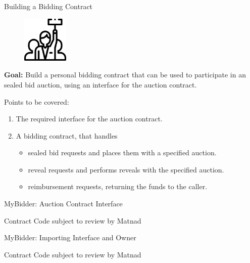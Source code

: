 \documentclass[handout]{beamer}
\begin{document}
\begin{frame}{Building a Bidding Contract}

\begin{minipage}{0.3\textwidth}
	\begin{figure}
		\center
		\includegraphics[width= 2.2cm]{../assets/images/bidder.png}	
	\end{figure}
\end{minipage}
\begin{minipage}{0.65\textwidth}
	\vspace{0.5em}
	\textbf{Goal:} Build a personal bidding contract that can be used to participate in an sealed bid auction, using an interface for the auction contract.\\
\end{minipage}

\vspace{2em}

Points to be covered:
\vspace{0.5em}
\begin{enumerate}
	\item	The required interface for the auction contract.
	\item	A bidding contract, that handles
	\vspace{0.5em}
	\begin{itemize}
		\item sealed bid requests and places them with a specified auction.
		\item reveal requests and performs reveals with the specified auction.
		\item reimbursement requests, returning the funds to the caller.
	\end{itemize}
\end{enumerate}


\end{frame}


\begin{frame}{MyBidder: Auction Contract Interface}

Contract Code subject to review by Matnad

\end{frame}


\begin{frame}{MyBidder: Importing Interface and Owner}

Contract Code subject to review by Matnad

\end{frame}
\end{document}
